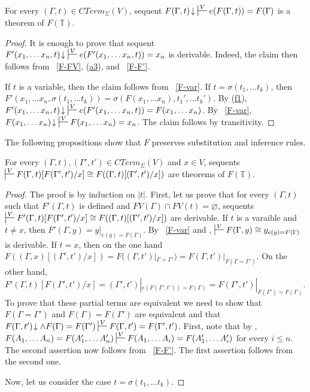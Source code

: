 \documentclass[reqno]{amsart}
\newcommand{\axref}[1]{(\hyperref[ax:#1]{#1})}
\theoremstyle{definition}
\theoremstyle{remark}
\numberwithin{figure}{section}
\begin{document}
\begin{lem}[F-e]
For every $(\Gamma,t) \in CTerm_\Sigma(V)$, sequent $F(\Gamma,t)\!\downarrow\ \sststile{}{V} e(F(\Gamma,t)) = F(\Gamma)$ is a theorem of $F(\mathbb{T})$.
\end{lem}
\begin{proof}
It is enough to prove that sequent $F'(x_1, \ldots x_n, t)\!\downarrow\ \sststile{}{V} e(F'(x_1, \ldots x_n, t)) = x_n$ is derivable.
Indeed, the claim then follows from ~\eqref{F-FV}, \axref{a3}, and ~\eqref{F-F'}.

If $t$ is a variable, then the claim follows from ~\eqref{F-var}.
If $t = \sigma(t_1, \ldots t_k)$, then $F'(x_1, \ldots x_n, \sigma(t_1, \ldots t_k)) = \sigma(F(x_1, \ldots x_n), t_1', \ldots t_k')$.
By \axref{f1}, $F'(x_1, \ldots x_n, t)\!\downarrow\ \sststile{}{V} e(F'(x_1, \ldots x_n, t)) = F(x_1, \ldots x_n)$.
By ~\eqref{F-var}, $F(x_1, \ldots x_n)\!\downarrow\ \sststile{}{V} F(x_1, \ldots x_n) = x_n$.
The claim follows by transitivity.
\end{proof}

The following propositions show that $F$ preserves substitution and inference rules.

\begin{prop}[F-subst]
For every $(\Gamma,t),(\Gamma',t') \in CTerm_\Sigma(V)$ and $x \in V$,
    sequents $\sststile{}{V} F(\Gamma,t)[F(\Gamma',t')/x] \cong F((\Gamma,t)[(\Gamma',t')/x])$ are theorems of $F(\mathbb{T})$.
\end{prop}
\begin{proof}
The proof is by induction on $|t|$.
First, let us prove that for every $(\Gamma,t)$ such that $F'(\Gamma,t)$ is defined and $FV(\Gamma) \cap FV(t) = \varnothing$,
    sequents $\sststile{}{V} F'(\Gamma,t)[F(\Gamma',t')/x] \cong F((\Gamma,t)[(\Gamma',t')/x])$ are derivable.
If $t$ is a varaible and $t \neq x$, then $F'(\Gamma,y) = y|_{e(y) = F(\Gamma)}$.
By ~\eqref{F-var} and , $\sststile{}{V} F(\Gamma,y) \cong y_{e(y) = F(\Gamma)}$ is derivable.
If $t = x$, then on the one hand $F((\Gamma,x)[(\Gamma',t')/x]) = F((\Gamma,t')|_{\Gamma = \Gamma'}) = F(\Gamma,t')|_{F(\Gamma = \Gamma')}$.
On the other hand, $F'(\Gamma,t)[F(\Gamma',t')/x] = (\Gamma',t')|_{e(F(\Gamma',t')) = F(\Gamma)} = F(\Gamma',t')|_{F(\Gamma') = F(\Gamma)}$.
To prove that these partial terms are equivalent we need to show that $F(\Gamma = \Gamma')$ and $F(\Gamma) = F(\Gamma')$ are equivalent
    and that $F(\Gamma,t')\!\downarrow \land F(\Gamma) = F(\Gamma') \sststile{}{V} F(\Gamma,t') = F(\Gamma',t')$.
First, note that by , $F(A_1, \ldots A_n) = F(A_1', \ldots A_n') \sststile{}{V} F(A_1, \ldots A_i) = F(A_1', \ldots A_i')$ for every $i \leq n$.
The second assertion now follows from ~\eqref{F-F'}.
The first assertion follows from the second one.

Now, let us consider the case $t = \sigma(t_1, \ldots t_k)$.
\end{proof}
\end{document}
